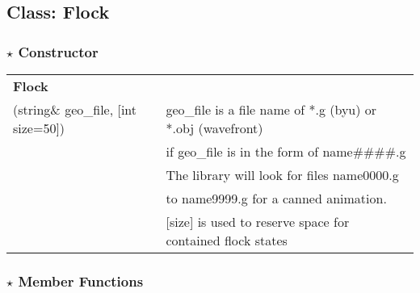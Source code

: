 \documentclass[onecolumn,10pt]{article}
\begin{document}
\subsection{Class: Flock}

\subsubsection*{$\star$ Constructor}

\begin{tabular}{|l|l|}\hline
{\bf Flock}                               & \\
(string\& geo\_file, [int size=50]) & geo\_file is a file name of *.g (byu) or *.obj (wavefront)\\
                                    & if geo\_file is in the form of name\#\#\#\#.g \\
				    & The library will look for files name0000.g \\
				    & to name9999.g for a canned animation. \\
                                    & [size] is used to reserve space for contained flock states \\\hline
\end{tabular}

\subsubsection*{$\star$ Member Functions}
\end{document}
